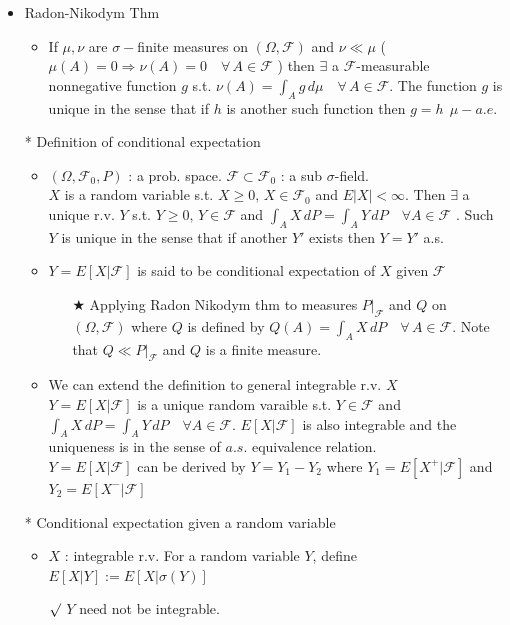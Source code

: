 \documentclass[12pt, A4]{article}
\newcommand{\rmk}{$\surd$}
\newcommand{\trick}{$\bigstar$}
\newcommand{\F}{\mathcal{F}}
\begin{document}
\begin{itemize}
\begin{itemize}
\begin{enumerate}
		\end{enumerate}
	\end{itemize}
	\item Radon-Nikodym Thm
	\begin{itemize}
		\item If $\mu, \nu$ are $\sigma-$finite measures on $(\Omega, \F)$ and $\nu \ll \mu$ ( $\mu(A)=0\Rightarrow \nu(A)=0 \quad \forall\, A\in \F$ ) then $\exists$ a $\F$-measurable nonnegative function $g$ s.t. $\nu(A)=\int_A g\, d\mu\quad \forall\, A\in \F$. The  function $g$ is unique in the sense that if $h$ is another such function then $g=h\;\, \mu-a.e.$
	\end{itemize}
	\item[*] Definition of conditional expectation
	\begin{itemize}
		\item $(\Omega, \F_0, P)$ : a prob. space. \;$\F\subset \F_0$ : a sub $\sigma$-field. \\ $X$ is a random variable s.t. $X\geq 0, \, X\in \F_0$ and $E|X|<\infty$. Then $\exists$ a unique r.v. $Y$ s.t. $Y\geq 0, \, Y\in \F$ and $\int_A X\, dP=\int_A Y\, dP\quad \forall A\in \F$ . Such $Y$ is unique in the sense that if another $Y'$ exists then $Y=Y'$ a.s.
		\item $Y=E[X|\F]$ is said to be conditional expectation of $X$ given $\F$
		\begin{itemize}
			\item[\trick] Applying Radon Nikodym thm to measures $P|_{\F}$ and $Q$ on $(\Omega, \F)$  where $Q$ is defined by $Q(A)=\int_A X\,dP\quad \forall \, A\in \F$. Note that $Q \ll P|_\F$ and $Q$ is a finite measure.
		\end{itemize}
		\item We can extend the definition to general integrable r.v. $X$ \\ $Y=E[X|\F]$ is a unique random varaible s.t. $Y\in \F$ and $\int_A X\, dP=\int_A Y\, dP\quad \forall A\in \F$. $E[X|\F]$ is also integrable and the uniqueness is in the sense of $a.s.$ equivalence relation. \\ $Y=E[X|\F]$ can be derived by $Y=Y_1-Y_2$ where $Y_1=E[X^+|\F]$ and $Y_2=E[X^-|\F]$
	\end{itemize} 
	\item[*] Conditional expectation given a random variable
	\begin{itemize}
		\item $X$ : integrable r.v. For a random variable $Y$, define $E[X|Y]:=E[X|\sigma(Y)]$ 
		\item[\rmk] $Y$ need not be integrable.

\end{itemize}
\end{itemize}
\end{document}
